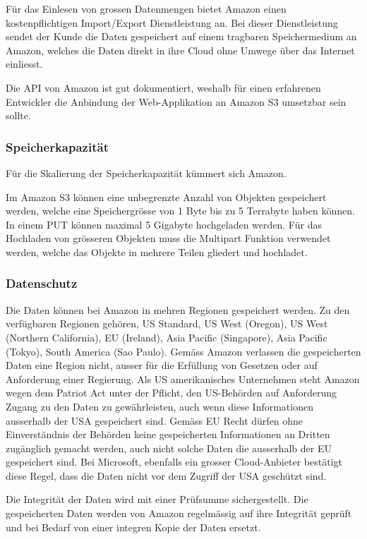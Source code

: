 Für das Einlesen von grossen Datenmengen bietet Amazon einen kostenpflichtigen Import/Export Dienstleistung an. Bei dieser Dienstleistung sendet der Kunde die Daten gespeichert auf einem tragbaren Speichermedium an Amazon, welches die Daten direkt in ihre Cloud ohne Umwege über das Internet einliesst.

Die API von Amazon ist gut dokumentiert, weshalb für einen erfahrenen Entwickler die Anbindung der Web-Applikation an Amazon S3 umsetzbar sein sollte.

\subsubsection*{Speicherkapazität}
Für die Skalierung der Speicherkapazität kümmert sich Amazon.

Im Amazon S3 können eine unbegrenzte Anzahl von Objekten gespeichert werden, welche eine Speichergrösse von 1 Byte bis zu 5 Terrabyte haben können. In einem PUT können maximal 5 Gigabyte hochgeladen werden. Für das Hochladen von grösseren Objekten muss die Multipart Funktion verwendet werden, welche das Objekte in mehrere Teilen gliedert und hochladet. \cite{Amazon2012b}

\subsubsection*{Datenschutz}
Die Daten können bei Amazon in mehren Regionen gespeichert werden. Zu den verfügbaren Regionen gehören, US Standard, US West (Oregon), US West (Northern California), EU (Ireland), Asia Pacific (Singapore), Asia Pacific (Tokyo), South America (Sao Paulo). Gemäss Amazon verlassen die gespeicherten Daten eine Region nicht, ausser für die Erfüllung von Gesetzen oder auf Anforderung einer Regierung. Als US amerikanisches Unternehmen steht Amazon wegen dem Patriot Act unter der Pflicht, den US-Behörden auf Anforderung Zugang zu den Daten zu gewährleisten, auch wenn diese Informationen ausserhalb der USA gespeichert sind. Gemäss EU Recht dürfen ohne Einverständnis der Behörden keine gespeicherten Informationen an Dritten zugänglich gemacht werden, auch nicht solche Daten die ausserhalb der EU gespeichert sind. Bei Microsoft, ebenfalls ein grosser Cloud-Anbieter bestätigt diese Regel, dass die Daten nicht vor dem Zugriff der USA geschützt sind. \cite{Amazon2012}\cite{Ostler}

Die Integrität der Daten wird mit einer Prüfsumme sichergestellt. Die gespeicherten Daten werden von Amazon regelmässig auf ihre Integrität geprüft und bei Bedarf von einer integren Kopie der Daten ersetzt. 

